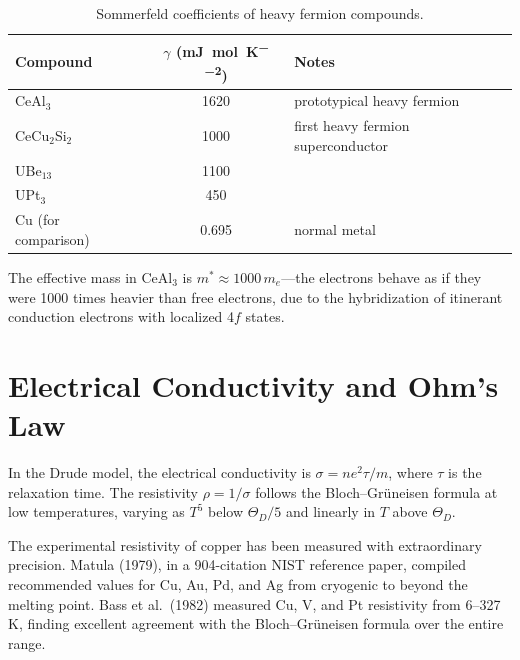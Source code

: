 \begin{table}[H]
\centering
\caption{Sommerfeld coefficients of heavy fermion compounds.}
\label{tab:heavy}
\begin{tabular}{@{}lSl@{}}
\toprule
Compound & {$\gamma$ (\si{\milli\joule\per\mole\per\kelvin\squared})} & Notes \\
\midrule
CeAl$_3$     & 1620 & prototypical heavy fermion \\
CeCu$_2$Si$_2$ & 1000 & first heavy fermion superconductor \\
UBe$_{13}$   &  1100 & \\
UPt$_3$      &  450 & \\
\midrule
Cu (for comparison) & 0.695 & normal metal \\
\bottomrule
\end{tabular}
\end{table}

The effective mass in CeAl$_3$ is $m^* \approx 1000\,m_e$---the electrons behave as if they were 1000 times heavier than free electrons, due to the hybridization of itinerant conduction electrons with localized 4$f$ states.


\section{Electrical Conductivity and Ohm's Law}

In the Drude model, the electrical conductivity is $\sigma = ne^2\tau/m$, where $\tau$ is the relaxation time. The resistivity $\rho = 1/\sigma$ follows the Bloch--Gr\"uneisen formula at low temperatures, varying as $T^5$ below $\Theta_D/5$ and linearly in $T$ above $\Theta_D$.

The experimental resistivity of copper has been measured with extraordinary precision. Matula (1979), in a 904-citation NIST reference paper, compiled recommended values for Cu, Au, Pd, and Ag from cryogenic to beyond the melting point. Bass et al.\ (1982) measured Cu, V, and Pt resistivity from 6--327 K, finding excellent agreement with the Bloch--Gr\"uneisen formula over the entire range.

